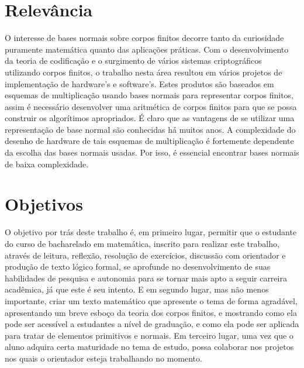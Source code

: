 \documentclass[12pt,twoside]{article}
\begin{document}
  \section*{Relevância}
    O interesse de bases normais sobre corpos finitos decorre tanto da
    curiosidade puramente matemática quanto das aplicações práticas. Com o
    desenvolvimento da teoria de codificação e o surgimento de vários sistemas
    criptográficos utilizando corpos finitos, o trabalho nesta área resultou em vários
    projetos de implementação de hardware's e software's. Estes produtos são
    baseados em esquemas de multiplicação usando bases normais para representar
    corpos finitos, assim é necessário desenvolver uma aritmética de corpos finitos para
    que se possa construir os algorítimos apropriados. É claro que as vantagens de se
    utilizar uma representação de base normal são conhecidas há muitos anos. A
    complexidade do desenho de hardware de tais esquemas de multiplicação é
    fortemente dependente da escolha das bases normais usadas. Por isso, é essencial
    encontrar bases normais de baixa complexidade. \\
    

  \section*{Objetivos}
    O objetivo por trás deste trabalho é, em primeiro lugar, permitir que o estudante do curso de
    bacharelado em matemática, inscrito para realizar este trabalho, através de leitura, reflexão, resolução
    de exercícios, discussão com orientador e produção de texto lógico formal, se aprofunde no
    desenvolvimento de suas habilidades de pesquisa e autonomia para se tornar mais apto a seguir
    carreira acadêmica, já que este é seu intento. E em segundo lugar, mas não menos importante, criar
    um texto matemático que apresente o tema de forma agradável, apresentando um breve esboço da
    teoria dos corpos finitos, e mostrando como ela pode ser acessível a estudantes a nível de graduação,
    e como ela pode ser aplicada para tratar de elementos primitivos e normais. Em terceiro lugar, uma
    vez que o aluno adquira certa maturidade no tema de estudo, possa colaborar nos projetos nos quais
    o orientador esteja trabalhando no momento.\\
    
\end{document}
